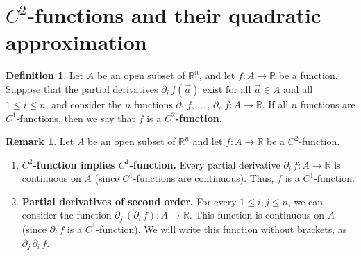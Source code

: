 \documentclass[11pt]{article}
\theoremstyle{definition}
\newtheorem{defn}[thm]{Definition}
\newtheorem{remark}[thm]{Remark}
\newcommand{\R}{\ensuremath{\mathbb{R}}}
\begin{document}
\newpage
{}
\section{$C^2$-functions and their quadratic approximation}

\begin{defn}
Let $A$ be an open subset of $\R^n$, and let $f : A \to \R$ be a function. Suppose that the partial derivatives $\partial_i\,f(\vec{a})$ exist for all $\vec{a} \in A$ and all $1 \leq i \leq n$, and consider the $n$ functions $\partial_1\,f,\, \dots \,,\, \partial_n\,f : A \to \R$. If all $n$ functions are $C^1$-functions, then we say that $f$ is a {\bf $C^2$-function}.
\end{defn}

\begin{remark}
Let $A$ be an open subset of $\R^n$ and let $f : A \to \R$ be a $C^2$-function.
\vspace{-1.5ex}\begin{enumerate}[(1)]
    \item {\bf $C^2$-function implies $C^1$-function.} Every partial derivative $\partial_i\,f : A \to \R$ is continuous on $A$ (since $C^1$-functions are continuous). Thus, $f$ is a $C^1$-function.
    \item {\bf Partial derivatives of second order.} For every $1 \leq i, j \leq n$, we can consider the function $\partial_j\,(\partial_i\,f) : A \to \R$. This function is continuous on $A$ (since $\partial_i\,f$ is a $C^1$-function). We will write this function without brackets, as $\partial_j\,\partial_i\,f$. 
\end{enumerate}\vspace{-1.5ex}
\end{remark}
\end{document}

